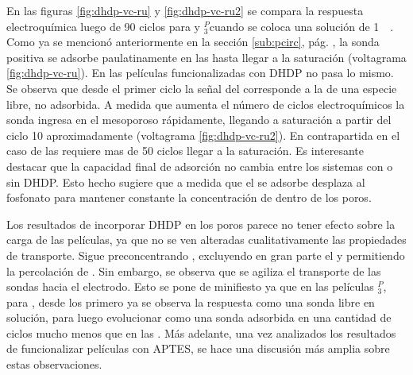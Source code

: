 		    En las figuras \ref{fig:dhdp-vc-ru} y \ref{fig:dhdp-vc-ru2} se compara la respuesta electroquímica luego de 90 ciclos para \pdmZ\space y \pdmZ$^P_3$\space cuando se coloca una solución de \ru\space \SI{1}{\milli\Molar}. Como ya se mencionó anteriormente en la sección \ref{sub:pcirc}, pág. \pageref{sub:pcirc}, la sonda positiva se adsorbe paulatinamente en las \pdmZ\space hasta llegar a la saturación (voltagrama \ref{fig:dhdp-vc-ru}). En las películas funcionalizadas con DHDP no pasa lo mismo. Se observa que desde el primer ciclo la señal del \ru\space corresponde a la de una especie libre, no adsorbida. A medida que aumenta el número de ciclos electroquímicos la sonda ingresa en el mesoporoso rápidamente, llegando a saturación a partir del ciclo 10 aproximadamente (voltagrama \ref{fig:dhdp-vc-ru2}). En contrapartida en el caso de las \pdmZ\space requiere mas de 50 ciclos llegar a la saturación. Es interesante destacar que la capacidad final de adsorción no cambia entre los sistemas con o sin DHDP. Esto hecho sugiere que a medida que el \ru\space se adsorbe desplaza al fosfonato para mantener constante la concentración de \ru\space dentro de los poros.

		    Los resultados de incorporar DHDP en los poros parece no tener efecto sobre la carga de las películas, ya que no se ven alteradas cualitativamente las propiedades de transporte. Sigue preconcentrando \ru, excluyendo en gran parte el \fe\space y permitiendo la percolación de \fc. Sin embargo, se observa que se agiliza el transporte de las sondas hacia el electrodo. Esto se pone de minifiesto ya que en las películas \pdmZ$^P_3$, para \ru,  desde los primero ya se observa la respuesta como una sonda libre en solución, para luego evolucionar como una sonda adsorbida en una cantidad de ciclos mucho menos que en las \pdmZ. Más adelante, una vez analizados los resultados de funcionalizar películas con APTES, se hace una discusión más amplia sobre estas observaciones. \vspace*{-2mm}
				
